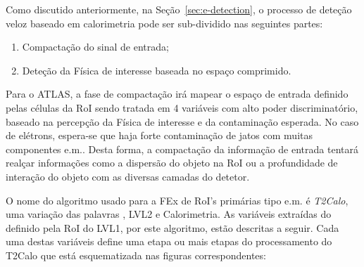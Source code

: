 Como discutido anteriormente, na Seção~\ref{sec:e-detection}, o processo de
deteção veloz baseado em calorimetria pode ser sub-dividido nas seguintes partes:

\begin{enumerate}
\item Compactação do sinal de entrada;
\item Deteção da Física de interesse baseada no espaço comprimido.
\end{enumerate}

Para o ATLAS, a fase de compactação irá mapear o espaço de entrada definido
pelas células da RoI sendo tratada em 4 variáveis com alto poder
discriminatório, baseado na percepção da Física de interesse e da contaminação
esperada. No caso de elétrons, espera-se que haja forte contaminação de jatos
com muitas componentes e.m.. Desta forma, a compactação da informação de entrada
tentará realçar informações como a dispersão do objeto na RoI ou a
profundidade de interação do objeto com as diversas camadas do detetor.

O nome do algoritmo usado para a FEx de RoI's primárias tipo e.m. é
\emph{T2Calo}, uma variação das palavras , LVL2 e
Calorimetria. As variáveis extraídas do  definido pela RoI do
LVL1, por este algoritmo, estão descritas a seguir. Cada uma destas variáveis
define uma etapa ou mais etapas do processamento do T2Calo que está
esquematizada nas figuras correspondentes:

